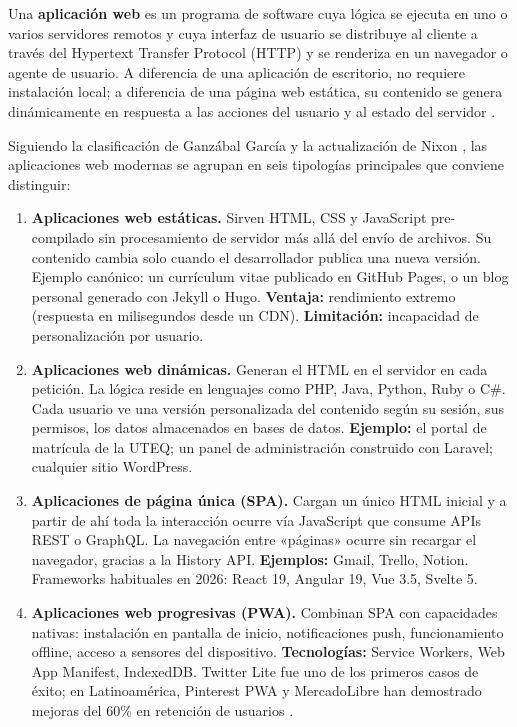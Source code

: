 \documentclass[11pt,a4paper,openany]{book}
\begin{document}
Una \textbf{aplicación web} es un programa de software cuya lógica se
ejecuta en uno o varios servidores remotos y cuya interfaz de usuario
se distribuye al cliente a través del Hypertext Transfer Protocol
(HTTP) y se renderiza en un navegador o agente de usuario. A diferencia
de una aplicación de escritorio, no requiere instalación local; a
diferencia de una página web estática, su contenido se genera
dinámicamente en respuesta a las acciones del usuario y al estado del
servidor \cite{shklar2009web}.

Siguiendo la clasificación de Ganzábal García
\cite{deitel2017java} y la actualización de Nixon
\cite{nixon2021learning}, las aplicaciones web modernas se agrupan en
seis tipologías principales que conviene distinguir:

\begin{enumerate}
\item \textbf{Aplicaciones web estáticas.} Sirven HTML, CSS y
JavaScript pre-compilado sin procesamiento de servidor más allá del
envío de archivos. Su contenido cambia solo cuando el desarrollador
publica una nueva versión. Ejemplo canónico: un currículum vitae
publicado en GitHub Pages, o un blog personal generado con Jekyll o
Hugo. \textbf{Ventaja:} rendimiento extremo (respuesta en
milisegundos desde un CDN). \textbf{Limitación:} incapacidad de
personalización por usuario.

\item \textbf{Aplicaciones web dinámicas.} Generan el HTML en el
servidor en cada petición. La lógica reside en lenguajes como PHP,
Java, Python, Ruby o C\#. Cada usuario ve una versión personalizada
del contenido según su sesión, sus permisos, los datos almacenados en
bases de datos. \textbf{Ejemplo:} el portal de matrícula de la UTEQ;
un panel de administración construido con Laravel; cualquier sitio
WordPress.

\item \textbf{Aplicaciones de página única (SPA).} Cargan un único
HTML inicial y a partir de ahí toda la interacción ocurre vía
JavaScript que consume APIs REST o GraphQL. La navegación entre
«páginas» ocurre sin recargar el navegador, gracias a la History API.
\textbf{Ejemplos:} Gmail, Trello, Notion. Frameworks habituales en
2026: React 19, Angular 19, Vue 3.5, Svelte 5.

\item \textbf{Aplicaciones web progresivas (PWA).} Combinan SPA con
capacidades nativas: instalación en pantalla de inicio,
notificaciones push, funcionamiento offline, acceso a sensores del
dispositivo. \textbf{Tecnologías:} Service Workers, Web App Manifest,
IndexedDB. Twitter Lite fue uno de los primeros casos de éxito; en
Latinoamérica, Pinterest PWA y MercadoLibre han demostrado mejoras
del 60\% en retención de usuarios \cite{richards2020fundamentals}.


\end{enumerate}
\end{document}
